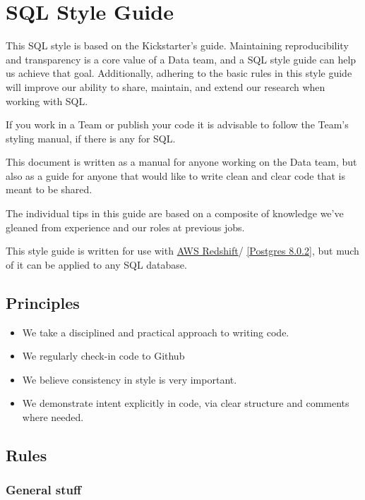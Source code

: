 
\chapter{SQL Style Guide}

This SQL style is based on the Kickstarter's guide. Maintaining reproducibility and transparency is a core value of a Data team, and a SQL style guide can help us achieve that goal. Additionally, adhering to the basic rules in this style guide will improve our ability to share, maintain, and extend our research when working with SQL.

If you work in a Team or publish your code it is advisable to follow the Team's styling manual, if there is any for SQL. 

This document is written as a manual for anyone working on the Data team, but also as a guide for anyone that  would like to write clean and clear code that is meant to be shared.

The individual tips in this guide are based on a composite of knowledge we've gleaned from experience and our roles at previous jobs.


This style guide is written for use with \href{https://aws.amazon.com/redshift/}{AWS Redshift}/ \href{http://www.postgresql.org/docs/8.0/static/release-8-0-2.html}{[Postgres 8.0.2]}, but much of it can be applied to any SQL database.

\section{Principles}

\begin{itemize}
  \item We take a disciplined and practical approach to writing code.
  \item We regularly check-in code to Github
  \item  We believe consistency in style is very important.
  \item  We demonstrate intent explicitly in code, via clear structure and comments where needed.
\end{itemize}

\section{Rules}

\subsection{General stuff}

